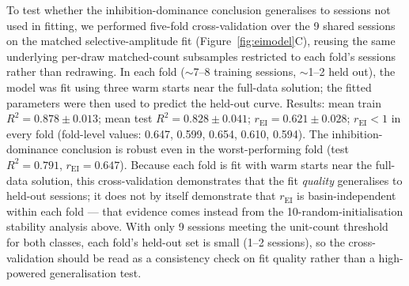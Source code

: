 \documentclass[11pt,onecolumn]{article}
\begin{document}
To test whether the inhibition-dominance conclusion generalises to
sessions not used in fitting, we performed five-fold cross-validation
over the 9 shared sessions on the matched selective-amplitude fit
(Figure~\ref{fig:eimodel}C), reusing the same underlying per-draw
matched-count subsamples restricted to each fold's sessions rather than
redrawing.  In each fold ($\sim$7--8 training sessions, $\sim$1--2 held
out), the model was fit using three warm starts near the full-data
solution; the fitted parameters were then used to predict the held-out
curve.  Results: mean train $R^2 = 0.878 \pm 0.013$; mean test
$R^2 = 0.828 \pm 0.041$; $r_\mathrm{EI} = 0.621 \pm 0.028$;
$r_\mathrm{EI} < 1$ in every fold (fold-level values: 0.647, 0.599,
0.654, 0.610, 0.594).  The inhibition-dominance conclusion is robust even
in the worst-performing fold (test $R^2 = 0.791$,
$r_\mathrm{EI} = 0.647$).  Because each fold is fit with warm starts near
the full-data solution, this cross-validation demonstrates that the fit
\textit{quality} generalises to held-out sessions; it does not by itself
demonstrate that $r_\mathrm{EI}$ is basin-independent within each fold ---
that evidence comes instead from the 10-random-initialisation stability
analysis above.  With only 9 sessions meeting the unit-count threshold for
both classes, each fold's held-out set is small (1--2 sessions), so the
cross-validation should be read as a consistency check on fit quality
rather than a high-powered generalisation test.
\end{document}

